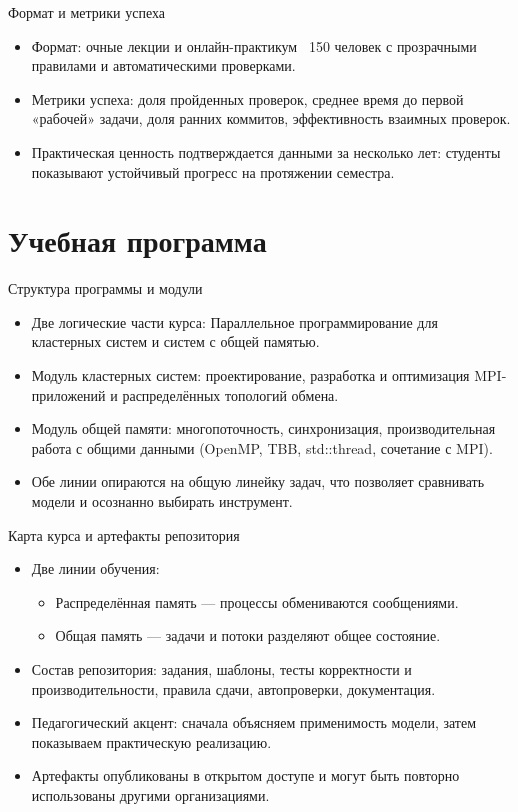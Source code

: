 \documentclass{beamer}
\begin{document}
\begin{frame}{Формат и метрики успеха}
  \begin{itemize}
    \item Формат: очные лекции и онлайн-практикум ~150 человек с прозрачными правилами и автоматическими проверками.
    \item Метрики успеха: доля пройденных проверок, среднее время до первой «рабочей» задачи, доля ранних коммитов, эффективность взаимных проверок.
    \item Практическая ценность подтверждается данными за несколько лет: студенты показывают устойчивый прогресс на протяжении семестра.
  \end{itemize}
\end{frame}

\section{Учебная программа}

\begin{frame}{Структура программы и модули}
  \begin{itemize}
    \item Две логические части курса: Параллельное программирование для кластерных систем и систем с общей памятью.
    \item Модуль кластерных систем: проектирование, разработка и оптимизация MPI-приложений и распределённых топологий обмена.
    \item Модуль общей памяти: многопоточность, синхронизация, производительная работа с общими данными (OpenMP, TBB, std::thread, сочетание с MPI).
    \item Обе линии опираются на общую линейку задач, что позволяет сравнивать модели и осознанно выбирать инструмент.
  \end{itemize}
\end{frame}

\begin{frame}{Карта курса и артефакты репозитория}
  \begin{itemize}
    \item Две линии обучения:
      \begin{itemize}
        \item Распределённая память — процессы обмениваются сообщениями.
        \item Общая память — задачи и потоки разделяют общее состояние.
      \end{itemize}
    \item Состав репозитория: задания, шаблоны, тесты корректности и производительности, правила сдачи, автопроверки, документация.
    \item Педагогический акцент: сначала объясняем применимость модели, затем показываем практическую реализацию.
    \item Артефакты опубликованы в открытом доступе и могут быть повторно использованы другими организациями.
  \end{itemize}
\end{frame}
\end{document}

